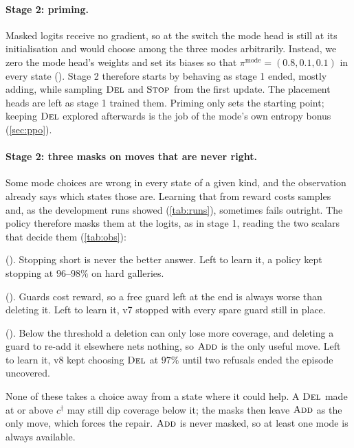 \documentclass[11pt,a4paper]{article}
\begin{document}
\paragraph{Stage 2: priming.}
Masked logits receive no gradient, so at the switch the mode head is still at its
initialisation and would choose among the three modes arbitrarily. Instead, we zero the mode
head's weights and set its biases so that $\pi^{\mathrm{mode}} = (0.8, 0.1, 0.1)$ in every state
(). Stage 2 therefore starts by behaving as stage 1 ended, mostly
adding, while sampling $\DEL$ and $\STOP$ from the first update. The placement heads are left
as stage 1 trained them. Priming only sets the starting point; keeping $\DEL$ explored
afterwards is the job of the mode's own entropy bonus (\cref{sec:ppo}).

\paragraph{Stage 2: three masks on moves that are never right.}
Some mode choices are wrong in every state of a given kind, and the observation already says
which states those are. Learning that from reward costs samples and, as the development runs
showed (\cref{tab:runs}), sometimes fails outright. The policy therefore masks them at the
logits, as in stage 1, reading the two scalars that decide them (\cref{tab:obs}):
\begin{description}[leftmargin=1.6em]
  \item[$\STOP$ below $c^\dagger$] (). Stopping short is never the better
        answer. Left to learn it, a policy kept stopping at $96$--$98\%$ on hard galleries.
  \item[$\STOP$ while a guard is free] (). Guards cost reward, so a
        free guard left at the end is always worse than deleting it. Left to learn it, v7 stopped
        with every spare guard still in place.
  \item[$\DEL$ below $c^\dagger$] (). Below the threshold a deletion can only
        lose more coverage, and deleting a guard to re-add it elsewhere nets nothing, so $\textsc{Add}$ is
        the only useful move. Left to learn it, v8 kept choosing $\DEL$ at $97\%$ until two refusals
        ended the episode uncovered.
\end{description}
None of these takes a choice away from a state where it could help. A $\DEL$ made at or
above $c^\dagger$ may still dip coverage below it; the masks then leave $\textsc{Add}$ as the only
move, which forces the repair. $\textsc{Add}$ is never masked, so at least one mode is always available.
\end{document}
